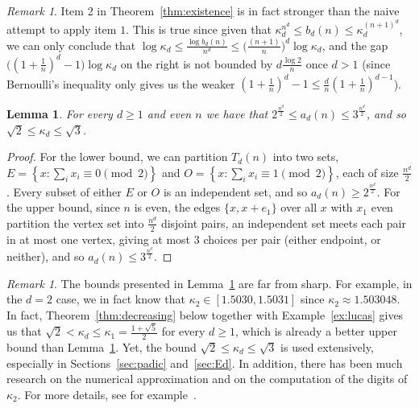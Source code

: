 \documentclass{article}
\theoremstyle{plain}
\newtheorem{lemma}[theorem]{Lemma}
\theoremstyle{definition}
\theoremstyle{remark}
\newtheorem{remark}[theorem]{Remark}
\begin{document}
\begin{remark}
Item 2 in Theorem~\ref{thm:existence} is in fact stronger than the naive attempt to apply item $1$. This is true since given that $\kappa_d^{n^d}\le b_d(n)\le\kappa_d^{(n+1)^d}$, we can only conclude that $\log\kappa_d\le\frac{\log b_d(n)}{n^d}\le\big(\frac{(n+1)}{n}\big)^d\log\kappa_d$, and the gap $\big((1+\frac{1}{n})^d-1\big)\log\kappa_d$ on the right is not bounded by $d\frac{\log2}{n}$ once $d>1$ (since Bernoulli's inequality only gives us the weaker $(1+\frac{1}{n})^d-1\le\frac dn(1+\frac{1}{n})^{d-1}$).
\end{remark}



\begin{lemma}\label{lem:naive_bound}
For every $d\ge1$ and even $n$ we have that $2^{\frac{n^d}{2}}\le a_d(n)\le3^{\frac{n^d}{2}}$, and so $\sqrt2\le\kappa_d\le\sqrt3$.
\end{lemma}
\begin{proof}
For the lower bound, we can partition $T_d(n)$ into two sets, $E=\left\{x:\sum_i x_i\equiv0\pmod2\right\}$ and $O=\left\{x:\sum_i x_i\equiv1\pmod2\right\}$, each of size $\frac{n^d}{2}$. Every subset of either $E$ or $O$ is an independent set, and so $a_d(n)\ge2^{\frac{n^d}{2}}$. For the upper bound, since $n$ is even, the edges $\{x,x+e_1\}$ over all $x$ with $x_1$ even partition the vertex set into $\frac{n^d}{2}$ disjoint pairs, an independent set meets each pair in at most one vertex, giving at most $3$ choices per pair (either endpoint, or neither), and so $a_d(n)\le3^{\frac{n^d}{2}}$.%
\end{proof}

\begin{remark}
The bounds presented in Lemma~\ref{lem:naive_bound} are far from sharp. For example, in the $d=2$ case, we in fact know that $\kappa_2\in[1.5030,1.5031]$ since $\kappa_2\approx1.503048$. In fact, Theorem~\ref{thm:decreasing} below together with Example~\ref{ex:lucas} gives us that $\sqrt{2} < \kappa_d \leq \kappa_1 = \frac{1+\sqrt{5}}{2}$ for every $d \geq 1$, which is already a better upper bound than Lemma~\ref{lem:naive_bound}. Yet, the bound $\sqrt2\le\kappa_d\le\sqrt3$ is used extensively, especially in Sections~\ref{sec:padic} and~\ref{sec:Ed}. In addition, there has been much research on the numerical approximation and on the computation of the digits of $\kappa_2$. For more details, see for example~\cite{baxter1999planar, CalkinWilf1998,Pavlov2012}. 
\end{remark}
\end{document}
